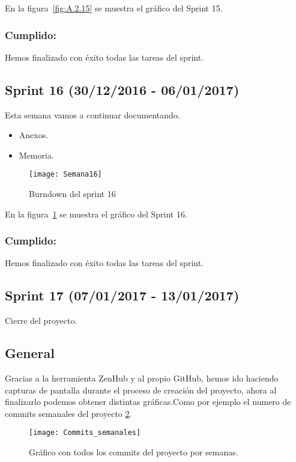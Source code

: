 En la figura~\ref{fig:A.2.15} se muestra el gráfico del Sprint 15.
\subsubsection{Cumplido:}
Hemos finalizado con éxito todas las tareas del sprint.

\subsection{Sprint 16 (30/12/2016 - 06/01/2017)}
Esta semana vamos a continuar documentando.

\begin{itemize}
	\item Anexos.
	\item Memoria.
\end{itemize}

\begin{figure}[h]
\centering
\texttt{[image: Semana16]}
\caption{Burndown del sprint 16}
\label{fig:A.2.16}

\end{figure}
En la figura~\ref{fig:A.2.16} se muestra el gráfico del Sprint 16.

\subsubsection{Cumplido:}
Hemos finalizado con éxito todas las tareas del sprint.

\subsection{Sprint 17 (07/01/2017 - 13/01/2017)}
Cierre del proyecto.

\subsection{General}

Gracias a la herramienta ZenHub y al propio GitHub, hemos ido haciendo capturas de pantalla durante el proceso de creación del proyecto, ahora al finalizarlo podemos obtener distintas gráficas.Como por ejemplo el numero de commits semanales del proyecto \ref{fig:comitSemana}.

\begin{figure}[h]
\centering
\texttt{[image: Commits\_semanales]}
\caption{Gráfico con todos los commits del proyecto por semanas.}
\label{fig:comitSemana}
\end{figure}

